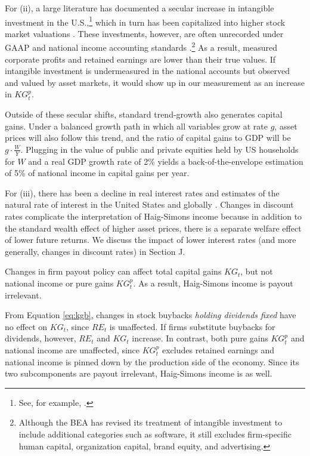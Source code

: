 \documentclass[12pt]{article}
\begin{document}

For (ii), a large literature has documented a secular increase in intangible investment in the U.S.,\footnote{See, for example, \citep{crouzet2022economics,peters2017intangible}.} which in turn has been capitalized into higher stock market valuations \citep{hall2001stock,mcgrattan2010unmeasured}. These investments, however, are often unrecorded under GAAP and national income accounting standards \citep{lev2001intangibles,corrado2009intangible}.\footnote{Although the BEA has revised its treatment of intangible investment to include additional categories such as software, it still excludes firm-specific human capital, organization capital, brand equity, and advertising.} As a result, measured corporate profits and retained earnings are lower than their true values. If intangible investment is undermeasured in the national accounts but observed and valued by asset markets, it would show up in our measurement as an increase in $KG_t^p$. 

Outside of these secular shifts, standard trend-growth also generates capital gains. Under a balanced growth path in which all variables grow at rate $g$, asset prices will also follow this trend, and the ratio of capital gains to GDP will be $g \cdot \frac{W}{Y}$. Plugging in the value of public and private equities held by US households for $W$ and a real GDP growth rate of 2\% yields a back-of-the-envelope estimation of 5\% of national income in capital gains per year. 

For (iii), there has been a decline in real interest rates and estimates of the natural rate of interest in the United States \citep{eggertsson2019model,laubach2016measuring} and globally \citep{rachel2019secular}. Changes in discount rates complicate the interpretation of Haig-Simons income because in addition to the standard wealth effect of higher asset prices, there is a separate welfare effect of lower future returns. We discuss the impact of lower interest rates (and more generally, changes in discount rates) in Section J. 

\begin{remark} \label{remark:payout}  Changes in firm payout policy can affect total capital gains $KG_t$, but not national income or pure gains $KG^p_t$. As a result, Haig-Simons income is payout irrelevant. \end{remark} 
\noindent From Equation \ref{eq:kgb}, changes in stock buybacks \textit{holding dividends fixed} have no effect on $KG_t$, since $RE_t$ is unaffected. If firms substitute buybacks for dividends, however, $RE_t$ and $KG_t$ increase. In contrast, both pure gains $KG_t^p$ and national income are unaffected, since $KG_t^p$ excludes retained earnings and national income is pinned down by the production side of the economy. Since its two subcomponents are payout irrelevant, Haig-Simons income is as well. 
\end{document}
